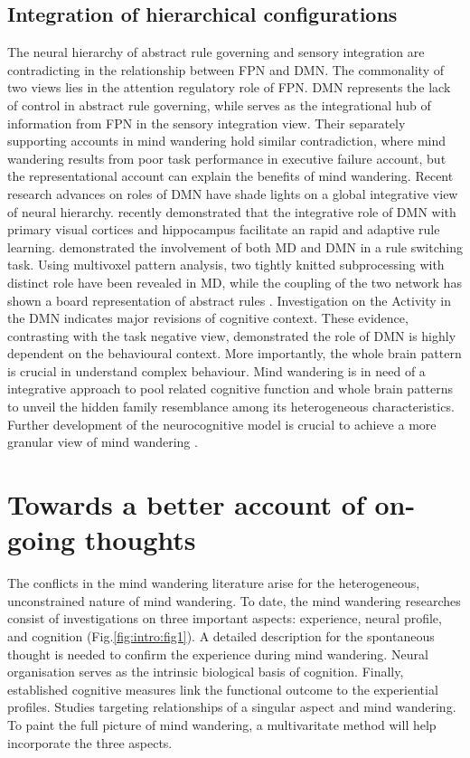 \subsection{Integration of hierarchical configurations}

The neural hierarchy of abstract rule governing and sensory integration are contradicting in the relationship between FPN and DMN. The commonality of two views lies in the attention regulatory role of FPN. DMN represents the lack of control in abstract rule governing, while serves as the integrational hub of information from FPN in the sensory integration view. Their separately supporting accounts in mind wandering hold similar contradiction, where mind wandering results from poor task performance in executive failure account, but the representational account can explain the benefits of mind wandering. Recent research advances on roles of DMN have shade lights on a global integrative view of neural hierarchy.  recently demonstrated that the integrative role of DMN with primary visual cortices and hippocampus facilitate an rapid and adaptive rule learning. \cite{Crittenden2015,Crittenden2016} demonstrated the involvement of both MD and DMN in a rule switching task. Using multivoxel pattern analysis, two tightly knitted subprocessing with distinct role have been revealed in MD, while the coupling of the two network has shown a board representation of abstract rules \cite{Crittenden2016}. Investigation on the Activity in the DMN indicates major revisions of cognitive context. These evidence, contrasting with the task negative view, demonstrated the role of DMN is highly dependent on the behavioural context. More importantly, the whole brain pattern is crucial in understand complex behaviour. Mind wandering is in need of a integrative approach to pool related cognitive function and whole brain patterns to unveil the hidden family resemblance among its heterogeneous characteristics. Further development of the neurocognitive model is crucial to achieve a more granular view of mind wandering \cite{Mittner2016,SmallwoodFrontiers2013}. 

\section{Towards a better account of on-going thoughts}

The conflicts in the mind wandering literature arise for the heterogeneous, unconstrained nature of mind wandering. To date, the mind wandering researches consist of investigations on three important aspects: experience, neural profile, and cognition (Fig.\ref{fig:intro:fig1}). A detailed description for the spontaneous thought is needed to confirm the experience during mind wandering. Neural organisation serves as the intrinsic biological basis of cognition. Finally, established cognitive measures link the functional outcome to the experiential profiles. Studies targeting relationships of a singular aspect and mind wandering. To paint the full picture of mind wandering, a multivaritate method will help incorporate the three aspects. 

